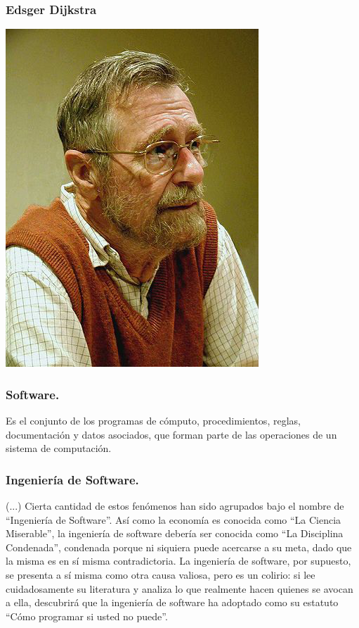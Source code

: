 \documentclass[12pt]{beamer}
\begin{document}
\begin{frame}
 \frametitle{Edsger Dijkstra}
 \begin{center}
    \includegraphics[scale=0.35]{img/dijkstra.png}
 \end{center}
\end{frame}

\begin{frame}
 \frametitle{Software.}
 Es el conjunto de los programas de cómputo, procedimientos, reglas, documentación y datos asociados, que forman parte de las operaciones de un sistema de computación.
 \newline
 \newline
 \newline
\end{frame}



\begin{frame}
 \frametitle{Ingeniería de Software.}
 (...) Cierta cantidad de estos fenómenos han sido agrupados bajo el nombre de “Ingeniería de Software”. Así como la economía es conocida como ``La Ciencia Miserable'', la ingeniería de software debería ser conocida como ``La Disciplina Condenada'', condenada porque ni siquiera puede acercarse a su meta, dado que la misma es en sí misma contradictoria. La ingeniería de software, por supuesto, se presenta a sí misma como otra causa valiosa, pero es un colirio: si lee cuidadosamente su literatura y analiza lo que realmente hacen quienes se avocan a ella, descubrirá que la ingeniería de software ha adoptado como su estatuto \alert{``Cómo programar si usted no puede''}.
 \newline
\end{frame}
\end{document}
